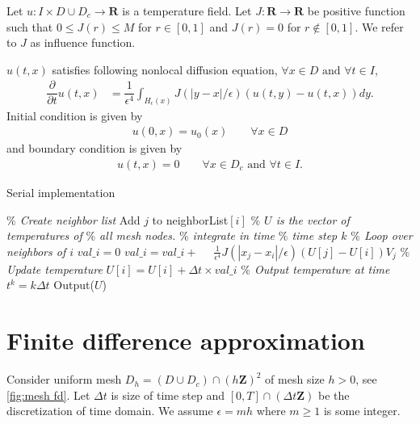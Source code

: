 \documentclass[11pt,twocolumn]{amsart}
\theoremstyle{definition}
\theoremstyle{definition}
\numberwithin{equation}{section}
\numberwithin{equation}{section}
\newcommand{\R}{\mathbf{R}}  %
\newcommand{\Z}{\mathbf{Z}}  %
\begin{document}
Let $u:I \times D\cup D_c \to \R$ is a temperature field. Let $J:\R \to \R$ be positive function such that $0\leq J(r) \leq M$ for $r\in [0,1]$ and $J(r) = 0$ for $r\notin [0,1]$. We refer to $J$ as influence function. 

$u(t,x)$ satisfies following nonlocal diffusion equation, $\forall x\in D \text{ and } \forall t \in I$,
\begin{align}\label{eq:diff eqn}
\dfrac{\partial }{\partial t} u(t,x) &= \dfrac{1}{\epsilon^4} \int_{H_\epsilon(x)} J(|y-x|/\epsilon) (u(t,y) - u(t,x)) dy .
\end{align}
Initial condition is given by
\begin{align}\label{eq:ic}
u(0,x) = u_0(x) \qquad \forall x\in D
\end{align}
and boundary condition is given by
\begin{align} \label{eq:bc}
u(t,x) = 0 \qquad \forall x\in D_c \text{ and } \forall t\in I.
\end{align}

\begin{algorithm}[ht]
	\caption{Serial implementation}
	\label{alg:serial}
	\begin{algorithmic}[1]
		\STATE \textcolor{mygray}{\it $\%$ Create neighbor list}
				\STATE Add $j$ to neighborList$[i]$
			\ENDIF
		\ENDFOR
		\STATE
		\STATE \textcolor{mygray}{\it $\%$ $U$ is the vector of temperatures of}
		\STATE \textcolor{mygray}{\it $\%$ all mesh nodes.}
		\STATE
		\STATE \textcolor{mygray}{\it $\%$ integrate in time}
			\STATE \textcolor{mygray}{\it $\%$ time step $k$}
				\STATE \textcolor{mygray}{\it $\%$ Loop over neighbors of $i$}
				\STATE $val\_i = 0$
					\STATE $val\_i = val\_i + $					
					\STATE $\quad \frac{1}{\epsilon^4} J(|x_j - x_i|/\epsilon) (U[j] - U[i])V_j$
				\ENDFOR
				\STATE \textcolor{mygray}{\it $\%$ Update temperature}
				\STATE $U[i] = U[i] + \Delta t \times val\_i$
			\ENDFOR	
			\STATE \textcolor{mygray}{\it $\%$ Output temperature at time $t^k = k\Delta t$}
			\STATE Output($U$)
		\ENDFOR
	\end{algorithmic}
\end{algorithm}

\section{Finite difference approximation}
Consider uniform mesh $D_h = (D\cup D_c)\cap (h\Z)^2$ of mesh size $h >0$, see \autoref{fig:mesh fd}. Let $\Delta t$ is size of time step and $[0,T]\cap (\Delta t \Z)$ be the discretization of time domain. We assume $\epsilon = m h$ where $m\geq 1$ is some integer.
\end{document}
